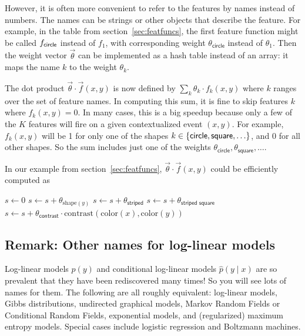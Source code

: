 \documentclass[11pt]{article}
\newcommand{\vtheta}{\vec{\theta}}
\newcommand{\ph}{\hat{p}}
\begin{document}
However, it is often more convenient to refer to the features by names
instead of numbers.  The names can be strings or other objects that
describe the feature.  For example, in the table from
section~\ref{sec:featfuncs}, the first feature function might be
called $f_{\sf circle}$ instead of $f_1$, with corresponding weight
$\theta_{\textsf{circle}}$ instead of $\theta_1$.  Then the weight vector
$\vtheta$ can be implemented as a hash table instead of an array: it
maps the name $k$ to the weight $\theta_k$.

The dot product $\vtheta \cdot \vec{f}(x,y)$ is now defined by
$\sum_k \theta_k \cdot f_k(x,y)$ where $k$ ranges over the set of
feature names.  
In computing this sum, it is fine to skip features $k$ where $f_k(x,y)
= 0$.  In many cases, this is a big speedup because only a few of the
$K$ features will fire on a given contextualized event $(x,y)$.  For
example, $f_k(x,y)$ will be 1 for only one of the shapes $k \in \{{\sf
  circle}, {\sf square}, \ldots\}$, and 0 for all other shapes.  So the 
sum includes just one of the weights $\theta_{\textsf{circle}},
\theta_{\textsf{square}}, \ldots$.

In our example from section~\ref{sec:featfuncs}, $\vtheta \cdot \vec{f}(x,y)$ could be efficiently
computed as
\begin{algorithmic}
\State $s \gets 0$
\State $s \gets s + \theta_{\textrm{shape}(y)}$
  \State $s \gets s + \theta_{\textsf{striped}}$
    \State $s \gets s + \theta_{\textsf{striped square}}$
  \EndIf
\EndIf
\State $s \gets s + \theta_{\textsf{contrast}} \cdot
\textrm{contrast}(\textrm{color}(x),\textrm{color}(y))$
\end{algorithmic}

\subsection{Remark: Other names for log-linear models}

Log-linear models $\ph(y)$ and conditional log-linear models
$\ph(y\mid x)$ are so prevalent that they have been rediscovered many
times!  So you will see lots of names for them.  The following are all
roughly equivalent: log-linear models, Gibbs distributions, undirected
graphical models, Markov Random Fields or Conditional Random Fields,
exponential models, and (regularized) maximum entropy models.  
Special cases include logistic regression and Boltzmann machines.
\end{document}
